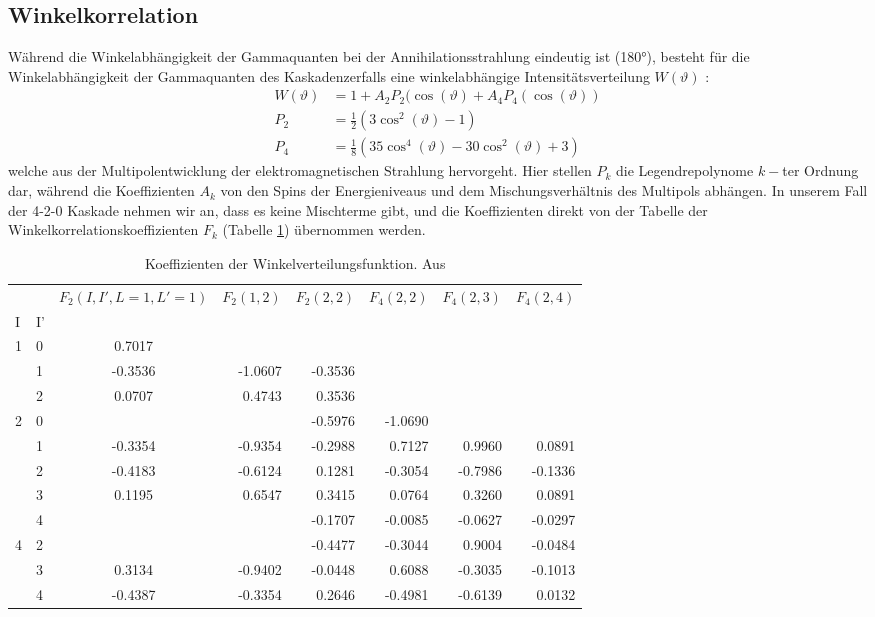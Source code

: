 \documentclass[%
aps,
onecolumn,
11pt,
tightenlines,
nofootinbib,
superscriptaddress,
floatfix,
prd,
]{revtex4-2}
\begin{document}
\subsection{Winkelkorrelation}
\label{sec:Winkelkorrelation}
Während die Winkelabhängigkeit der Gammaquanten bei der Annihilationsstrahlung eindeutig ist (180°), besteht für die Winkelabhängigkeit der Gammaquanten des Kaskadenzerfalls eine winkelabhängige Intensitätsverteilung $W(\vartheta)$ \cite{manual1}:
\begin{align}
	W(\vartheta) &= 1 + A_2 P_2(\cos (\vartheta) + A_4 P_4(\cos (\vartheta)) \\
    P_2          &= \frac{1}{2}\left(3\cos^2(\vartheta) - 1 \right) \nonumber \\
    P_4          &= \frac{1}{8}\left(35\cos^4(\vartheta) - 30\cos^2(\vartheta) + 3 \right) \nonumber
\end{align}
welche aus der Multipolentwicklung der elektromagnetischen Strahlung hervorgeht. Hier stellen $P_k$ die Legendrepolynome $k-$ter Ordnung dar, während die Koeffizienten $A_k$ von den Spins der Energieniveaus und dem Mischungsverhältnis des Multipols abhängen. In unserem Fall der 4-2-0 Kaskade nehmen wir an, dass es keine Mischterme gibt, und die Koeffizienten direkt von der Tabelle der Winkelkorrelationskoeffizienten $F_k$ (Tabelle \ref{tab:angularcorrelationcoefficient}) übernommen werden.
\begin{table}[ht]
\begin{tabular}{llcrrrrr}
\toprule
 &  & $F_2(I,I',L=1, L'=1)$ & $F_2(1,2)$  & $F_2(2,2)$  & $F_4(2,2)$ & $F_4(2,3)$  & $F_4(2,4)$ \\
I & I’ &  &  &  &  &  &  \\
\midrule
\multirow[t]{3}{*}{1} & 0 & 0.7017 &  &  &  &  &  \\
 & 1 & -0.3536 & -1.0607 & -0.3536 &  &  &  \\
 & 2 & 0.0707 & 0.4743 & 0.3536 &  &  &  \\
\cline{1-8}
\multirow[t]{3}{*}{2} & 0 &  &  & -0.5976 & -1.0690 &  &  \\
 & 1 & -0.3354 & -0.9354 & -0.2988 & 0.7127 & 0.9960 & 0.0891 \\
 & 2 & -0.4183 & -0.6124 & 0.1281 & -0.3054 & -0.7986 & -0.1336 \\
 & 3 & 0.1195 & 0.6547 & 0.3415 & 0.0764 & 0.3260 & 0.0891 \\
 & 4 &  &  & -0.1707 & -0.0085 & -0.0627 & -0.0297 \\
\cline{1-8}
\multirow[t]{3}{*}{4} & 2 &  &  & -0.4477 & -0.3044 & 0.9004 & -0.0484 \\
 & 3 & 0.3134 & -0.9402 & -0.0448 & 0.6088 & -0.3035 & -0.1013 \\
 & 4 & -0.4387 & -0.3354 & 0.2646 & -0.4981 & -0.6139 & 0.0132 \\
\cline{1-8}
\bottomrule
\end{tabular}
\caption{Koeffizienten der Winkelverteilungsfunktion. Aus \cite{manual1}}
\label{tab:angularcorrelationcoefficient}
\end{table} \\
\end{document}
